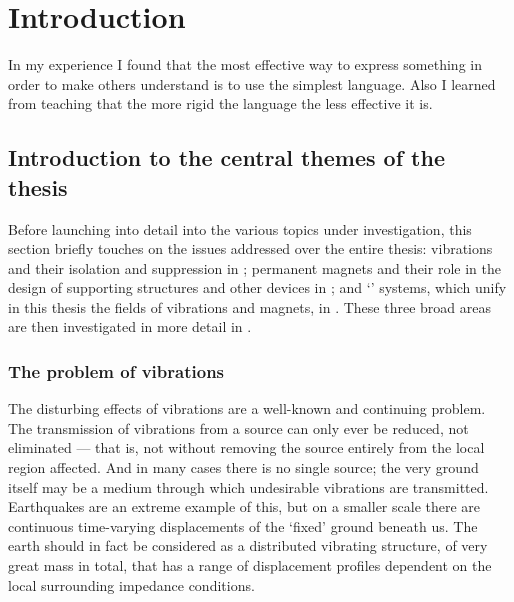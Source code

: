 
\chapter{Introduction}

\epigraph{In my experience I found that the most effective way to express
something in order to make others understand is to use the simplest language.
Also I learned from teaching that the more rigid the language the less
effective it is.}{\textcite{mahathera1990}}

\section{Introduction to the central themes of the thesis}

Before launching into detail into the various topics under investigation, this
section briefly touches on the issues addressed over the entire thesis:
vibrations and their isolation and suppression in
; permanent magnets and their role in the
design of supporting structures and other devices in
; and `\qzs' systems, which unify in this thesis
the fields of vibrations and magnets, in . These
three broad areas are then investigated in more detail in .

\subsection{The problem of vibrations}

The disturbing effects of vibrations are a well-known and continuing problem.
The transmission of vibrations from a source can only ever be reduced, not
eliminated — that is, not without removing the source entirely from the local
region affected. And in many cases there is no single source; the very ground
itself may be a medium through which undesirable vibrations are transmitted.
Earthquakes are an extreme example of this, but on a smaller scale there are
continuous time-varying displacements of the `fixed' ground beneath us.
 The earth should in fact be considered
as a distributed vibrating structure, of very great mass in total, that has a
range of displacement profiles dependent on the local surrounding impedance
conditions.

